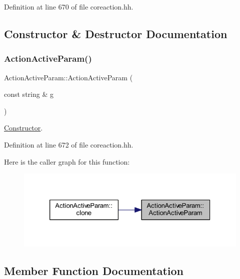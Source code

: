 Definition at line 670 of file coreaction.\+hh.



\subsection{Constructor \& Destructor Documentation}
\mbox{\label{class_action_active_param_a2048afd3f4b5377f11d9418d36fdb2f6}} 
\subsubsection{\texorpdfstring{ActionActiveParam()}{ActionActiveParam()}}
{\footnotesize\ttfamily Action\+Active\+Param\+::\+Action\+Active\+Param (\begin{DoxyParamCaption}\item[{const string \&}]{g }\end{DoxyParamCaption})\hspace{0.3cm}{\ttfamily [inline]}}



\mbox{\hyperlink{class_constructor}{Constructor}}. 



Definition at line 672 of file coreaction.\+hh.

Here is the caller graph for this function\+:
\nopagebreak
\begin{figure}[H]
\begin{center}
\leavevmode
\includegraphics[width=326pt]{class_action_active_param_a2048afd3f4b5377f11d9418d36fdb2f6_icgraph}
\end{center}
\end{figure}


\subsection{Member Function Documentation}
\mbox{\label{class_action_active_param_ab4bc14613f94c7114c1890d436c4d729}} 
